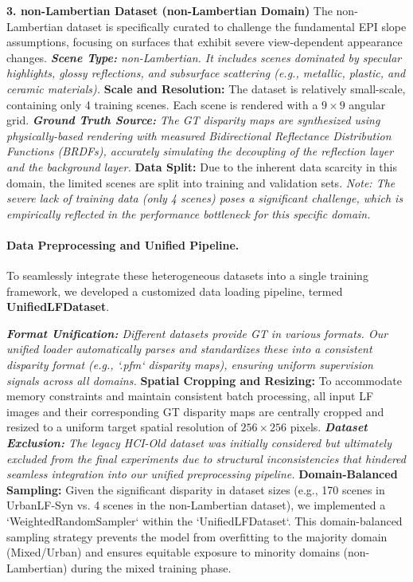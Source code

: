 \documentclass[lettersize,journal]{IEEEtran}
\begin{document}
\textbf{3. non-Lambertian Dataset (non-Lambertian Domain)}
The non-Lambertian dataset  is specifically curated to challenge the fundamental EPI slope assumptions, focusing on surfaces that exhibit severe view-dependent appearance changes.
\textit{   \textbf{Scene Type:} non-Lambertian. It includes scenes dominated by specular highlights, glossy reflections, and subsurface scattering (e.g., metallic, plastic, and ceramic materials).
}   \textbf{Scale and Resolution:} The dataset is relatively small-scale, containing only 4 training scenes. Each scene is rendered with a $9 \times 9$ angular grid. 
\textit{   \textbf{Ground Truth Source:} The GT disparity maps are synthesized using physically-based rendering with measured Bidirectional Reflectance Distribution Functions (BRDFs), accurately simulating the decoupling of the reflection layer and the background layer.
}   \textbf{Data Split:} Due to the inherent data scarcity in this domain, the limited scenes are split into training and validation sets. \textit{Note: The severe lack of training data (only 4 scenes) poses a significant challenge, which is empirically reflected in the performance bottleneck for this specific domain.}

\paragraph{Data Preprocessing and Unified Pipeline.}

To seamlessly integrate these heterogeneous datasets into a single training framework, we developed a customized data loading pipeline, termed \textbf{UnifiedLFDataset}. 

\textit{   \textbf{Format Unification:} Different datasets provide GT in various formats. Our unified loader automatically parses and standardizes these into a consistent disparity format (e.g., `.pfm` disparity maps), ensuring uniform supervision signals across all domains.
}   \textbf{Spatial Cropping and Resizing:} To accommodate memory constraints and maintain consistent batch processing, all input LF images and their corresponding GT disparity maps are centrally cropped and resized to a uniform target spatial resolution of $256 \times 256$ pixels.
\textit{   \textbf{Dataset Exclusion:} The legacy HCI-Old dataset  was initially considered but ultimately excluded from the final experiments due to structural inconsistencies that hindered seamless integration into our unified preprocessing pipeline.
}   \textbf{Domain-Balanced Sampling:} Given the significant disparity in dataset sizes (e.g., 170 scenes in UrbanLF-Syn vs. 4 scenes in the non-Lambertian dataset), we implemented a `WeightedRandomSampler` within the `UnifiedLFDataset`. This domain-balanced sampling strategy prevents the model from overfitting to the majority domain (Mixed/Urban) and ensures equitable exposure to minority domains (non-Lambertian) during the mixed training phase.
\end{document}
